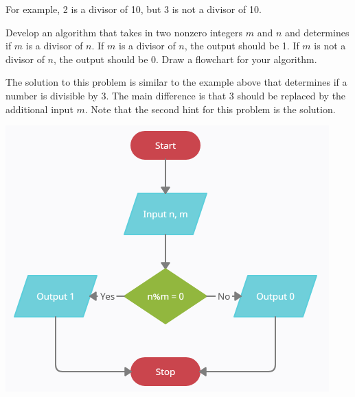 \documentclass{ximera}
\begin{document}
For example, 2 is a divisor of 10, but 3 is not a divisor of 10.

\begin{question}
	Develop an algorithm that takes in two nonzero integers $m$ and $n$ and determines if $m$ is a divisor of $n$. If $m$ is a divisor of $n$, the output should be 1. If $m$ is not a divisor of $n$, the output should be 0. Draw a flowchart for your algorithm.
	\begin{hint}
		The solution to this problem is similar to the example above that determines if a number is divisible by 3. The main difference is that 3 should be replaced by the additional input $m$. Note that the second hint for this problem is the solution.
	\end{hint}
	\begin{hint}
		\begin{center}
			\includegraphics{divisor.png}
		\end{center}
	\end{hint}
\end{question}
\end{document}
